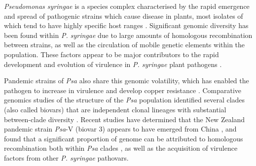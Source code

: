 \textit{Pseudomonas syringae} is a species complex characterised by the rapid emergence and spread of pathogenic strains which cause disease in plants, most isolates of which tend to have highly specific host ranges \citep{Mazzaglia2012-et}. Significant genomic diversity has been found within \textit{P. syringae} due to large amounts of homologous recombination between strains, as well as the circulation of mobile genetic elements within the population. These factors appear to be major contributors to the rapid development and evolution of virulence in \textit{P. syringae} plant pathogens \citep{Monteil2016-jx}.

Pandemic strains of \textit{Psa} also share this genomic volatility, which has enabled the pathogen to increase in virulence and develop copper resistance \citep{Colombi2017-yfs}. Comparative genomics studies of the structure of the \textit{Psa} population identified several clades (also called biovars) that are independent clonal lineages with substantial between-clade diversity \citep{McCann2013-jz,Mazzaglia2012-et,Chapman2012-cw}. Recent studies have determined that the New Zealand pandemic strain \textit{Psa}-V (biovar 3) appears to have emerged from China \citep{McCann2017-hy,Butler_Stockwell_Black_Day_Lamont_Poulter_2013}, and found that a significant proportion of genome can be attributed to homologous recombination both within \textit{Psa} clades \citep{McCann2013-jz}, as well as the acquisition of virulence factors from other \textit{P. syringae} pathovars.

